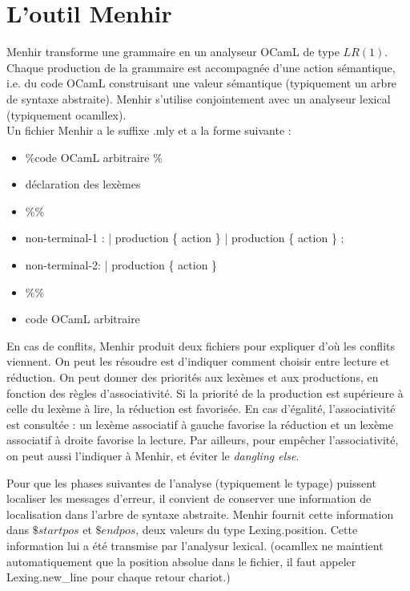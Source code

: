 \documentclass{cours}
\begin{document}
\section{L'outil Menhir}
Menhir transforme une grammaire en un analyseur OCamL de type $LR(1)$. Chaque production de la grammaire est accompagnée d'une action sémantique, i.e. du code OCamL construisant une valeur sémantique (typiquement un arbre de syntaxe abstraite). Menhir s'utilise conjointement avec un analyseur lexical (typiquement \textrm{ocamllex}).\\
Un fichier Menhir a le suffixe \textmd{.mly} et a la forme suivante : 
\begin{itemize}
    \item \%{\textmd{code OCamL arbitraire} \%}
    \item \textmd{déclaration des lexèmes}
    \item \%\%
    \item \textmd{non-terminal-1 : }
    | \textmd{production} \{ \textmd{action} \}
    | \textmd{production} \{ \textmd{action} \}
    ;
    \item non-terminal-2:
    | \textmd{production} \{ \textmd{action} \}
    \item \%\%
    \item \textmd{code OCamL arbitraire}
\end{itemize}
En cas de conflits, Menhir produit deux fichiers pour expliquer d'où les conflits viennent. On peut les résoudre est d'indiquer comment choisir entre lecture et réduction. On peut donner des priorités aux lexèmes et aux productions, en fonction des règles d'associativité. Si la priorité de la production est supérieure à celle du lexème à lire, la réduction est favorisée. En cas d'égalité, l'associativité est consultée : un lexème associatif à gauche favorise la réduction et un lexème associatif à droite favorise la lecture. Par ailleurs, pour empêcher l'associativité, on peut aussi l'indiquer à Menhir, et éviter le \textit{dangling else}.

Pour que les phases suivantes de l'analyse (typiquement le typage) puissent localiser les messages d'erreur, il convient de conserver une information de localisation dans l'arbre de syntaxe abstraite. Menhir fournit cette information dans $\$startpos$ et $\$endpos$, deux valeurs du type \textmd{Lexing.position}. Cette information lui a été transmise par l'analysur lexical. (\textmd{ocamllex} ne maintient automatiquement que la position absolue dans le fichier, il faut appeler Lexing.new\_line pour chaque retour chariot.)
\end{document}
